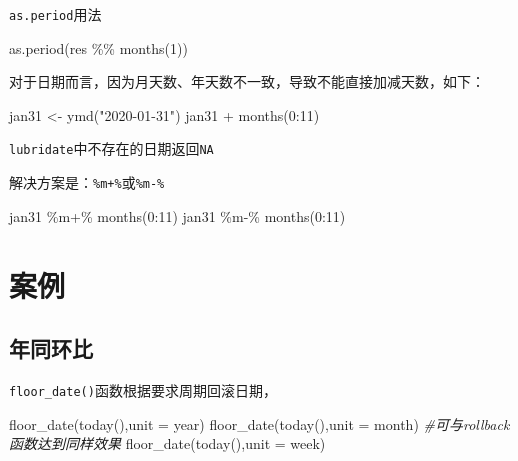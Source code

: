 \documentclass[
]{book}
\newenvironment{Shaded}{\begin{snugshade}}{\end{snugshade}}
\newcommand{\AttributeTok}[1]{\textcolor[rgb]{0.77,0.63,0.00}{#1}}
\newcommand{\CommentTok}[1]{\textcolor[rgb]{0.56,0.35,0.01}{\textit{#1}}}
\newcommand{\DecValTok}[1]{\textcolor[rgb]{0.00,0.00,0.81}{#1}}
\newcommand{\FunctionTok}[1]{\textcolor[rgb]{0.00,0.00,0.00}{#1}}
\newcommand{\NormalTok}[1]{#1}
\newcommand{\OtherTok}[1]{\textcolor[rgb]{0.56,0.35,0.01}{#1}}
\newcommand{\SpecialCharTok}[1]{\textcolor[rgb]{0.00,0.00,0.00}{#1}}
\newcommand{\StringTok}[1]{\textcolor[rgb]{0.31,0.60,0.02}{#1}}
\begin{document}
\texttt{as.period}用法

\begin{Shaded}
\begin{Highlighting}[]
\FunctionTok{as.period}\NormalTok{(res }\SpecialCharTok{\%\%} \FunctionTok{months}\NormalTok{(}\DecValTok{1}\NormalTok{))}
\end{Highlighting}
\end{Shaded}

对于日期而言，因为月天数、年天数不一致，导致不能直接加减天数，如下：

\begin{Shaded}
\begin{Highlighting}[]
\NormalTok{jan31 }\OtherTok{\textless{}{-}} \FunctionTok{ymd}\NormalTok{(}\StringTok{"2020{-}01{-}31"}\NormalTok{)}
\NormalTok{jan31 }\SpecialCharTok{+} \FunctionTok{months}\NormalTok{(}\DecValTok{0}\SpecialCharTok{:}\DecValTok{11}\NormalTok{)}
\end{Highlighting}
\end{Shaded}

\texttt{lubridate}中不存在的日期返回\texttt{NA}

解决方案是：\texttt{\%m+\%}或\texttt{\%m-\%}

\begin{Shaded}
\begin{Highlighting}[]
\NormalTok{jan31 }\SpecialCharTok{\%m+\%} \FunctionTok{months}\NormalTok{(}\DecValTok{0}\SpecialCharTok{:}\DecValTok{11}\NormalTok{)}
\NormalTok{jan31 }\SpecialCharTok{\%m{-}\%} \FunctionTok{months}\NormalTok{(}\DecValTok{0}\SpecialCharTok{:}\DecValTok{11}\NormalTok{)}
\end{Highlighting}
\end{Shaded}

\hypertarget{ux6848ux4f8b}{%
\section{案例}\label{ux6848ux4f8b}}

\hypertarget{ux5e74ux540cux73afux6bd4}{%
\subsection{年同环比}\label{ux5e74ux540cux73afux6bd4}}

\texttt{floor\_date()}函数根据要求周期回滚日期，

\begin{Shaded}
\begin{Highlighting}[]
\FunctionTok{floor\_date}\NormalTok{(}\FunctionTok{today}\NormalTok{(),}\AttributeTok{unit =} \StringTok{\textquotesingle{}year\textquotesingle{}}\NormalTok{)}
\FunctionTok{floor\_date}\NormalTok{(}\FunctionTok{today}\NormalTok{(),}\AttributeTok{unit =} \StringTok{\textquotesingle{}month\textquotesingle{}}\NormalTok{) }\CommentTok{\#可与rollback函数达到同样效果}
\FunctionTok{floor\_date}\NormalTok{(}\FunctionTok{today}\NormalTok{(),}\AttributeTok{unit =} \StringTok{\textquotesingle{}week\textquotesingle{}}\NormalTok{)}
\end{Highlighting}
\end{Shaded}
\end{document}
